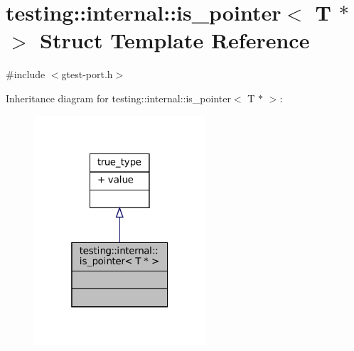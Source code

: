 \hypertarget{structtesting_1_1internal_1_1is__pointer_3_01T_01_5_01_4}{}\section{testing\+:\+:internal\+:\+:is\+\_\+pointer$<$ T $\ast$ $>$ Struct Template Reference}
\label{structtesting_1_1internal_1_1is__pointer_3_01T_01_5_01_4}


{\ttfamily \#include $<$gtest-\/port.\+h$>$}



Inheritance diagram for testing\+:\+:internal\+:\+:is\+\_\+pointer$<$ T $\ast$ $>$\+:
\nopagebreak
\begin{figure}[H]
\begin{center}
\leavevmode
\includegraphics[width=181pt]{structtesting_1_1internal_1_1is__pointer_3_01T_01_5_01_4__inherit__graph}
\end{center}
\end{figure}


